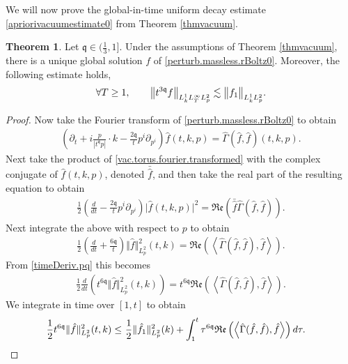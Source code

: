 \documentclass[reqno]{amsart}
\newcommand{\pv}{p}
\def\norm#1{\big\Vert#1\big\Vert}
\newcommand{\irnp}[2]{\left\langle {#1},{#2} \right\rangle}
\newcommand{\qq}{\mathfrak{q}}
\newcommand{\tq}{t^{\qq}}
\newcommand{\tQQq}{t^{6\qq}}
\newcommand{\real}[1]{\mathfrak{Re}\left(#1\right)}
\theoremstyle{definition}
\newtheorem{theorem}{Theorem}
\numberwithin{equation}{section}
\numberwithin{theorem}{section}
\begin{document}
We will now prove the global-in-time uniform decay estimate \eqref{apriorivacuumestimate0} from Theorem \ref{thmvacuum}. 



\begin{theorem}
    Let \(\qq\in (\frac{1}{3},1]\). Under the assumptions of Theorem \ref{thmvacuum}, there is a unique global solution \(f\) of \eqref{perturb.massless.rBoltz0}. Moreover, the following estimate holds,
\begin{equation}\notag 
\forall T\geq 1,\qquad {\norm{t^{3\qq} f}_{L^1_kL^\infty_TL^2_{\pv}}}
\lesssim 
\norm{f_1}_{L^1_kL^2_{\pv}}.  
\end{equation}
\end{theorem}

\begin{proof}
Now take the Fourier transform of \eqref{perturb.massless.rBoltz0} to obtain
\begin{align}\label{vac.torus.fourier.transformed}
\left(\partial_t  + i\frac{\pv}{|\tq \pv|}\cdot k 
-\frac{2\qq }{t} p^i \partial_{p^i} \right) \hat{f}(t,k,\pv)
=\hat{\Gamma}(\hat{f},\hat{f})(t,k,\pv).
\end{align}
Next take  the product of  \eqref{vac.torus.fourier.transformed} with the complex conjugate of $\hat{f}(t,k,\pv)$, denoted $\bar{\hat{f}}$, and then take the real part of the resulting equation to obtain
\begin{align*}
\frac{1}{2}\left(\frac{d}{dt}   
-\frac{2\qq }{t} p^i \partial_{p^i} \right)
\vert \hat{f}(t,k,\pv)\vert^2
=\real{\bar{\hat{f}}\hat{\Gamma}(\hat{f},\hat{f})}.
\end{align*}
Next integrate the above with respect to $\pv$ to obtain
\begin{align*}
    \frac{1}{2}\left(\frac{d}{dt}   
+\frac{6\qq }{t}  \right)\Vert \hat{f}\Vert_{L^2_{\pv}}^2(t,k)
= \real{\irnp{\hat{\Gamma}(\hat{f},\hat{f})}{\hat{f}}}.
\end{align*}
From \eqref{timeDeriv.pq} this becomes
\begin{align*}
    \frac{1}{2}\frac{d}{dt}  \left( \tQQq
\Vert \hat{f}\Vert_{L^2_{\pv}}^2(t,k)  \right)= \tQQq\real{\irnp{\hat{\Gamma}(\hat{f},\hat{f})}{\hat{f}}}.
\end{align*}
We integrate in time over $[1,t]$ to obtain
\begin{align}\notag
\frac{1}{2} \tQQq \Vert \hat{f}\Vert_{L^2_{\pv}}^2(t,k)
\leq &~\frac{1}{2}\Vert \hat{f}_1\Vert_{L^2_{\pv}}^2(k)
+\int^t_1 \tau^{6\qq}\real{\irnp{\hat{\Gamma}(\hat{f},\hat{f})}{\hat{f}}}
d\tau.

\end{align}
\end{proof}
\end{document}

